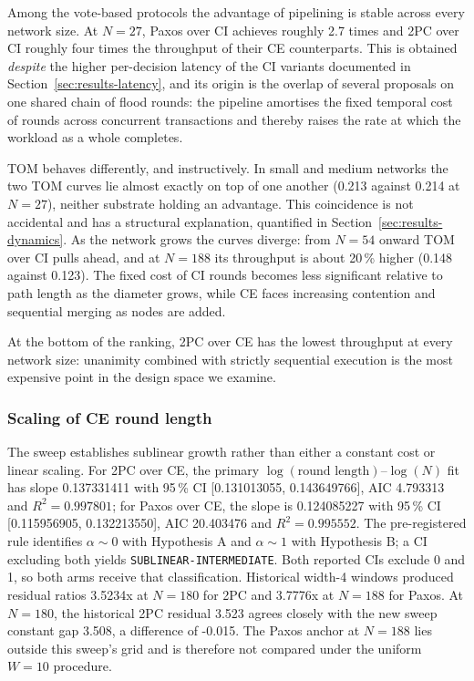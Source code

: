 \documentclass[journal]{IEEEtran}
\newcommand{\CI}{CI}                      %
\newcommand{\CE}{CE}                      %
\newcommand{\Nnodes}{N}                   %
\begin{document}
Among the vote-based protocols the advantage of pipelining is stable
across every network size. At $\Nnodes = 27$, Paxos over \CI{} achieves
roughly 2.7 times and 2PC over \CI{} roughly four times the throughput of
their \CE{} counterparts. This is obtained \emph{despite} the higher
per-decision latency of the \CI{} variants documented in
Section~\ref{sec:results-latency}, and its origin is the overlap of
several proposals on one shared chain of flood rounds: the pipeline
amortises the fixed temporal cost of rounds across concurrent
transactions and thereby raises the rate at which the workload as a whole
completes.

TOM behaves differently, and instructively. In small and medium networks
the two TOM curves lie almost exactly on top of one another
(0.213 against 0.214 at $\Nnodes = 27$), neither substrate holding an
advantage. This coincidence is not accidental and has a structural
explanation, quantified in Section~\ref{sec:results-dynamics}. As the
network grows the curves diverge: from $\Nnodes = 54$ onward TOM over
\CI{} pulls ahead, and at $\Nnodes = 188$ its throughput is about 20\,\%
higher (0.148 against 0.123). The fixed cost of \CI{} rounds becomes less
significant relative to path length as the diameter grows, while \CE{}
faces increasing contention and sequential merging as nodes are added.

At the bottom of the ranking, 2PC over \CE{} has the lowest throughput at
every network size: unanimity combined with strictly sequential execution
is the most expensive point in the design space we examine.

\subsubsection{Scaling of CE round length}

The sweep establishes sublinear growth rather than either a constant cost
or linear scaling. For 2PC over \CE, the primary
$\log(\text{round length})$--$\log(\Nnodes)$ fit has slope 0.137331411 with
95\,\% CI [0.131013055, 0.143649766], AIC 4.793313 and
$R^2=0.997801$; for Paxos over \CE, the slope is 0.124085227 with 95\,\% CI
[0.115956905, 0.132213550], AIC 20.403476 and $R^2=0.995552$. The
pre-registered rule identifies $\alpha \sim 0$ with Hypothesis A and
$\alpha \sim 1$ with Hypothesis B; a CI excluding both yields
\texttt{SUBLINEAR-INTERMEDIATE}. Both reported CIs exclude 0 and 1, so both
arms receive that classification. Historical width-4 windows produced
residual ratios 3.5234x at $\Nnodes=180$ for 2PC and 3.7776x at
$\Nnodes=188$ for Paxos. At $\Nnodes=180$, the historical 2PC residual
3.523 agrees closely with the new sweep constant gap 3.508, a difference of
-0.015. The Paxos anchor at $\Nnodes=188$ lies outside this sweep's grid and
is therefore not compared under the uniform $W=10$ procedure.
\end{document}
